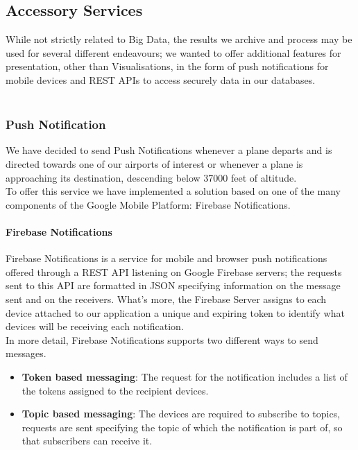 \subsection{Accessory Services}

While not strictly related to Big Data, the results we archive and process may be used for several different endeavours; we wanted to offer additional features for presentation, other than Visualisations, in the form of push notifications for mobile devices and REST APIs to access securely data in our databases.
\\ \\

\subsubsection{Push Notification}
We have decided to send Push Notifications whenever a plane departs and is directed towards one of our airports of interest or whenever a plane is approaching its destination, descending below 37000 feet of altitude.
\\
To offer this service we have implemented a solution based on one of the many components of the Google Mobile Platform: Firebase Notifications.

\paragraph{Firebase Notifications}

Firebase Notifications is a service for mobile and browser push notifications offered through a REST API listening on Google Firebase servers; the requests sent to this API are formatted in JSON specifying information on the message sent and on the receivers.
What's more, the Firebase Server assigns to each device attached to our application a unique and expiring token to identify what devices will be receiving each notification.
\\
In more detail, Firebase Notifications supports two different ways to send messages.

\begin{itemize}
	\item \textbf{Token based messaging}: The request for the notification includes a list of the tokens assigned to the recipient devices. 
	\item \textbf{Topic based messaging}: The devices are required to subscribe to topics, requests are sent specifying the topic of which the notification is part of, so that subscribers can receive it.
\end{itemize}  


